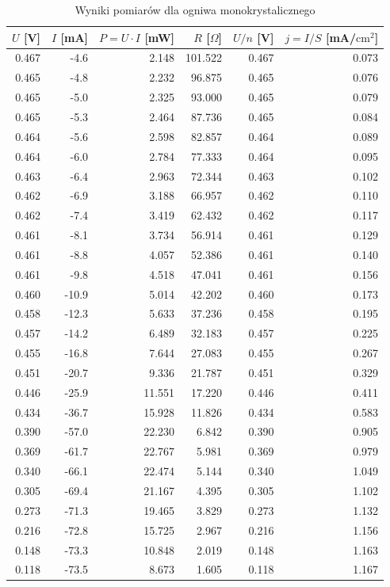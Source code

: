 \documentclass{fizykalab}
\begin{document}
\begin{table}[H]
    \caption{Wyniki pomiarów dla ogniwa monokrystalicznego}
    \centering
    \begin{tabular}{rrrrrr}
\toprule
$U$ [V] & $I$ [mA] & $P = U \cdot I$ [mW] & $R$ [$\Omega$] & $U/n$ [V] & $j=I/S$ [mA/$\text{cm}^2$] \\
\midrule
0.467 & -4.6 & 2.148 & 101.522 & 0.467 & 0.073 \\
0.465 & -4.8 & 2.232 & 96.875 & 0.465 & 0.076 \\
0.465 & -5.0 & 2.325 & 93.000 & 0.465 & 0.079 \\
0.465 & -5.3 & 2.464 & 87.736 & 0.465 & 0.084 \\
0.464 & -5.6 & 2.598 & 82.857 & 0.464 & 0.089 \\
0.464 & -6.0 & 2.784 & 77.333 & 0.464 & 0.095 \\
0.463 & -6.4 & 2.963 & 72.344 & 0.463 & 0.102 \\
0.462 & -6.9 & 3.188 & 66.957 & 0.462 & 0.110 \\
0.462 & -7.4 & 3.419 & 62.432 & 0.462 & 0.117 \\
0.461 & -8.1 & 3.734 & 56.914 & 0.461 & 0.129 \\
0.461 & -8.8 & 4.057 & 52.386 & 0.461 & 0.140 \\
0.461 & -9.8 & 4.518 & 47.041 & 0.461 & 0.156 \\
0.460 & -10.9 & 5.014 & 42.202 & 0.460 & 0.173 \\
0.458 & -12.3 & 5.633 & 37.236 & 0.458 & 0.195 \\
0.457 & -14.2 & 6.489 & 32.183 & 0.457 & 0.225 \\
0.455 & -16.8 & 7.644 & 27.083 & 0.455 & 0.267 \\
0.451 & -20.7 & 9.336 & 21.787 & 0.451 & 0.329 \\
0.446 & -25.9 & 11.551 & 17.220 & 0.446 & 0.411 \\
0.434 & -36.7 & 15.928 & 11.826 & 0.434 & 0.583 \\
0.390 & -57.0 & 22.230 & 6.842 & 0.390 & 0.905 \\
0.369 & -61.7 & 22.767 & 5.981 & 0.369 & 0.979 \\
0.340 & -66.1 & 22.474 & 5.144 & 0.340 & 1.049 \\
0.305 & -69.4 & 21.167 & 4.395 & 0.305 & 1.102 \\
0.273 & -71.3 & 19.465 & 3.829 & 0.273 & 1.132 \\
0.216 & -72.8 & 15.725 & 2.967 & 0.216 & 1.156 \\
0.148 & -73.3 & 10.848 & 2.019 & 0.148 & 1.163 \\
0.118 & -73.5 & 8.673 & 1.605 & 0.118 & 1.167 \\
\bottomrule
\end{tabular}

\end{table}
\end{document}

